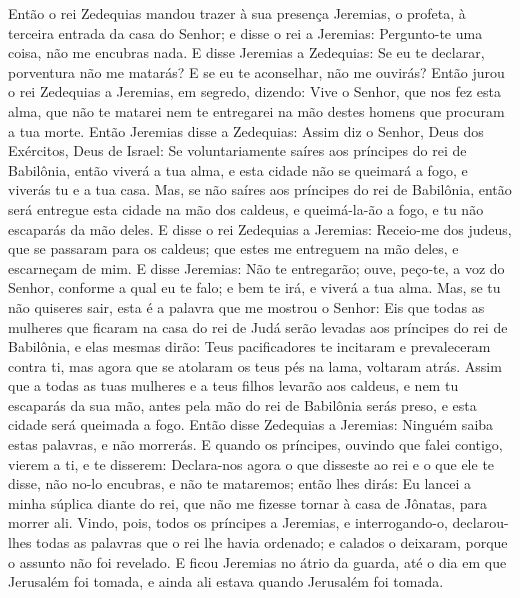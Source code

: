 Então o rei Zedequias mandou trazer à sua presença Jeremias, o
profeta, à terceira entrada da casa do Senhor; e disse o rei a
Jeremias: Pergunto-te uma coisa, não me encubras nada. E
disse Jeremias a Zedequias: Se eu te declarar, porventura não me
matarás? E se eu te aconselhar, não me ouvirás? Então jurou o
rei Zedequias a Jeremias, em segredo, dizendo: Vive o Senhor, que
nos fez esta alma, que não te matarei nem te entregarei na mão
destes homens que procuram a tua morte. Então Jeremias disse
a Zedequias: Assim diz o Senhor, Deus dos Exércitos, Deus de Israel:
Se voluntariamente saíres aos príncipes do rei de Babilônia, então
viverá a tua alma, e esta cidade não se queimará a fogo, e viverás
tu e a tua casa. Mas, se não saíres aos príncipes do rei de
Babilônia, então será entregue esta cidade na mão dos caldeus, e
queimá-la-ão a fogo, e tu não escaparás da mão deles. E disse
o rei Zedequias a Jeremias: Receio-me dos judeus, que se passaram
para os caldeus; que estes me entreguem na mão deles, e escarneçam
de mim. E disse Jeremias: Não te entregarão; ouve, peço-te, a
voz do Senhor, conforme a qual eu te falo; e bem te irá, e viverá a
tua alma. Mas, se tu não quiseres sair, esta é a palavra que
me mostrou o Senhor: Eis que todas as mulheres que ficaram na
casa do rei de Judá serão levadas aos príncipes do rei de Babilônia,
e elas mesmas dirão: Teus pacificadores te incitaram e prevaleceram
contra ti, mas agora que se atolaram os teus pés na lama, voltaram
atrás. Assim que a todas as tuas mulheres e a teus filhos
levarão aos caldeus, e nem tu escaparás da sua mão, antes pela mão
do rei de Babilônia serás preso, e esta cidade será queimada a fogo.
Então disse Zedequias a Jeremias: Ninguém saiba estas
palavras, e não morrerás. E quando os príncipes, ouvindo que
falei contigo, vierem a ti, e te disserem: Declara-nos agora o que
disseste ao rei e o que ele te disse, não no-lo encubras, e não te
mataremos; então lhes dirás: Eu lancei a minha súplica diante
do rei, que não me fizesse tornar à casa de Jônatas, para morrer
ali. Vindo, pois, todos os príncipes a Jeremias, e
interrogando-o, declarou-lhes todas as palavras que o rei lhe havia
ordenado; e calados o deixaram, porque o assunto não foi revelado.
E ficou Jeremias no átrio da guarda, até o dia em que
Jerusalém foi tomada, e ainda ali estava quando Jerusalém foi
tomada.

\medskip

